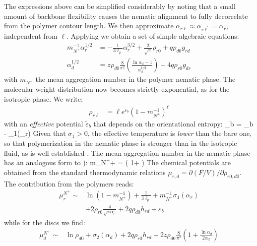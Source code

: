 The expressions above can be simplified considerably by noting that a small amount  of backbone flexibility causes the nematic alignment to fully decorrelate from the polymer contour length. We then approximate $\alpha_{r \ell} \approx \alpha_{r \ell^{\prime}} = \alpha_{r}$, independent from $\ell$.   Applying  we obtain a set of simple algebraic equations:
\begin{align}
      m_{N^{+}}^{-1} \alpha_{r}^{1/2}  &= - \frac{1}{3\ell_{p}} \alpha_{r}^{3/2} + \frac{2}{\sqrt{\pi}}  \rho_{r0} + q \rho_{d0}  g_{rd} \nonumber \\
         \alpha_{d}^{1/2} &=  z \rho_{d0} \frac{8}{\pi^{2}}\left (  \frac{ \ln \alpha_{d} -1}{\alpha_{d}^{1/2}} \right ) 
  + 4 q \rho_{r0} g_{dr} 
  \label{alphaplus}
\end{align}
with $m_{N^{+}}$ the mean aggregation number in the polymer nematic phase.
The  molecular-weight distribution  now becomes strictly exponential, as for the isotropic phase. We write:
\begin{align}
\rho_{r \ell } & = \ell e^{ \tilde{\varepsilon}_{b}} \left ( 1 - m_{N^{+}}^{-1} \right ) ^{\ell} \label{disn}
\end{align}
with an {\em effective} potential $\tilde{\varepsilon}_{b}$ that depends on the orientational entropy:
\beq
\tilde{\varepsilon}_{b} = \varepsilon_{b} - \sigma_{1}(\alpha_{r}) 
\label{tempnplus}
\eeq
Given that $\sigma_{1} >0$, the effective temperature is {\em lower} than the bare one, so that polymerization in the nematic phase is stronger than in the isotropic fluid, as is well established \cite{vdschoot1994epl,vdschoot1994la}. The mean aggregation number in the nematic phase  has an analogous form to ):
\beq
m_{N^{+}}  =  \left ( 1+ \right ) 
\eeq
The chemical potentials are obtained from the standard thermodynamic relations $\mu_{r,d}  = \partial (F/V) /\partial \rho_{r0,d0}$. The contribution from the polymers reads:
\begin{align}
\mu_{r}^{N^{+}}  \sim & \ln ( 1 - m_{N^{+}}^{-1}) + \frac{1}{3 \ell_{p}}  +  m_{N^{+}}^{-1} \sigma_{1}(\alpha_{r})  \nonumber \\
& + 2  \rho_{r0}   \frac{4}{\sqrt{\pi \alpha_{r}}}  +   2 q \rho_{d0} h_{rd}
+ \varepsilon_{b} 
\end{align}
while for the discs we find:
\begin{align}
\mu_{d}^{N^{+}}  \sim  & \ln \rho_{d0}  + \sigma_{2}(\alpha_{d})  +   2 q \rho_{r0}  
h_{rd} + 2 z \rho_{d0} 
\frac{8}{\pi^{2}} \left ( 1+ \frac{\ln \alpha_{d}}{2 \alpha_{d}} \right )
\end{align}
